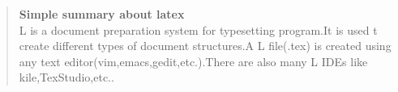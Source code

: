 \documentclass[a3 paper]{article}
\begin{document}
\begin{abstract}
\textbf{Simple summary about latex}\\
L is a document preparation system for typesetting program.It is used t create different
types of document structures.A L file(.tex) is created using any text
editor(vim,emacs,gedit,etc.).There are also many L IDEs like kile,TexStudio,etc..
\end{abstract}
\end{document}
